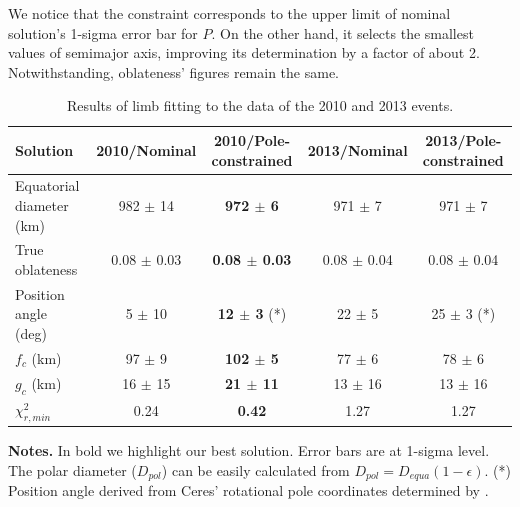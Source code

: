 \documentclass[useAMS,usenatbib]{mn2e}
\begin{document}
We notice that the constraint corresponds to the upper limit of nominal solution's 1-sigma error bar for $P$. On the other hand, it selects the smallest values of semimajor axis, improving its determination by a factor of about 2. Notwithstanding, oblateness' figures remain the same.


\begin{table}
 \centering
 \begin{minipage}{140mm}
  \caption{Results of limb fitting to the data of the 2010 and 2013 events.\label{Tab: results}}
  \begin{tabular}{@{}lcccc}
  \hline
     Solution & 2010/Nominal & \textbf{2010/Pole-constrained} & 2013/Nominal & 2013/Pole-constrained \\
\hline
Equatorial diameter (km) & 982 $\pm$ 14 & \textbf{972 $\pm$ 6}  & 971 $\pm$ 7  & 971 $\pm$ 7\\
True oblateness        & 0.08 $\pm$ 0.03 & \textbf{0.08 $\pm$ 0.03} & 0.08 $\pm$ 0.04 & 0.08 $\pm$ 0.04\\
Position angle (deg)   & 5 $\pm$ 10    & \textbf{12 $\pm$ 3} (*)& 22 $\pm$ 5    & 25 $\pm$ 3 (*)\\
$f_c$ (km)             & 97 $\pm$ 9   & \textbf{102 $\pm$ 5}   & 77 $\pm$ 6    & 78 $\pm$ 6\\
$g_c$ (km)             & 16 $\pm$ 15  & \textbf{21 $\pm$ 11}  & 13 $\pm$ 16   & 13 $\pm$ 16\\
$\chi^2_{r,min}$       & 0.24          &  \textbf{0.42}         & 1.27          & 1.27\\
\hline
\end{tabular}
\textbf{Notes.} In bold we highlight our best solution. Error bars are at 1-sigma level. The polar diameter ($D_{pol}$) can be easily calculated from $D_{pol}=D_{equa}(1 - \epsilon)$.
(*) Position angle derived from Ceres' rotational pole coordinates determined by \cite{Drummond2014}.
\end{minipage}
\end{table}
\end{document}
